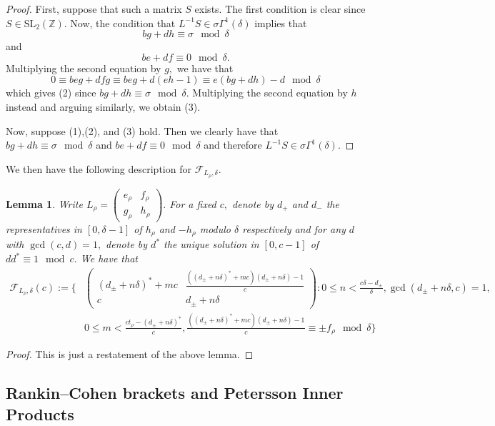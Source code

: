 \documentclass[10pt]{amsart}
\newtheorem{lemma}[theorem]{Lemma}
\theoremstyle{definition}
\theoremstyle{remark}
\numberwithin{equation}{section}
\newcommand{\SL}{\mathrm{SL}}
\newcommand{\Z}{\mathbb Z}
\begin{document}
	\begin{proof}
		First, suppose that such a matrix $S$ exists. The first condition is clear since $S\in\SL_2(\Z).$ Now, the condition that $L^{-1}S\in\sigma\Gamma^1(\delta)$ implies that
		$$
		bg+dh\equiv \sigma\mod\delta
		$$
		and
		$$
		be+df\equiv 0\mod\delta.
		$$
		Multiplying the second equation by $g,$ we have that
		$$
		0\equiv beg+dfg\equiv beg+d(eh-1)\equiv e(bg+dh)-d\mod\delta
		$$
		which gives (2) since $bg+dh\equiv\sigma\mod\delta.$ Multiplying the second equation by $h$ instead and arguing similarly, we obtain (3).
		
		Now, suppose (1),(2), and (3) hold. Then we clearly have that $bg+dh\equiv \sigma\mod\delta$ and $be+df\equiv 0\mod\delta$ and therefore $L^{-1}S\in\sigma\Gamma^1(\delta).$
	\end{proof}
	
	We then have the following description for $\mathcal{F}_{L_\rho,\delta}.$
		
		
	\begin{lemma}
	Write $L_\rho=\begin{pmatrix}
		e_\rho & f_\rho \\
		g_\rho & h_\rho
	\end{pmatrix}.$ For a fixed $c,$ denote by $d_+$ and $d_{-}$ the representatives in $[0,\delta-1]$ of $h_\rho$ and $-h_\rho$ modulo $\delta$ respectively and for any $d$ with $\gcd(c,d)=1,$ denote by $d^\ast$ the unique solution in $[0,c-1]$ of $dd^\ast\equiv 1\mod c$.
	We have that 
		\begin{align*}
		\mathcal{F}_{L_\rho,\delta}(c):=\Bigg\{&\begin{pmatrix}
		(d_{\pm}+n\delta)^\ast + mc & \frac{	((d_{\pm}+n\delta)^\ast + mc)(d_{\pm}+n\delta) - 1}{c} \\
		c & d_{\pm}+n\delta
	\end{pmatrix} : 0\leq n < \frac{c\delta-d_\pm}{\delta}, \gcd(d_\pm+n\delta,c)=1, \\
	&0\leq m < \frac{ct_\rho-(d_{\pm}+n\delta)^\ast}{c}, \frac{((d_{\pm}+n\delta)^\ast + mc)(d_{\pm}+n\delta) - 1}{c}\equiv \pm f_\rho\mod\delta \Bigg\}
		\end{align*}
	\end{lemma}
	
	\begin{proof}
		This is just a restatement of the above lemma.
	\end{proof}
	
	\subsection{Rankin--Cohen brackets and Petersson Inner Products}
	
\end{document}
